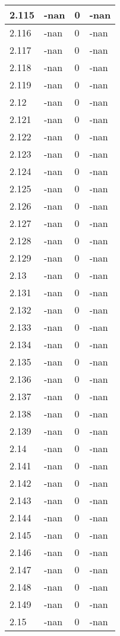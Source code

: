 \documentclass[a4paper,14pt]{extarticle}
\begin{document}
\begin{longtable}{||m{3cm}||m{3cm}|m{3cm}||m{3cm}||}
\hline
2.115 & -nan & 0 & -nan\\
\hline
2.116 & -nan & 0 & -nan\\
\hline
2.117 & -nan & 0 & -nan\\
\hline
2.118 & -nan & 0 & -nan\\
\hline
2.119 & -nan & 0 & -nan\\
\hline
2.12 & -nan & 0 & -nan\\
\hline
2.121 & -nan & 0 & -nan\\
\hline
2.122 & -nan & 0 & -nan\\
\hline
2.123 & -nan & 0 & -nan\\
\hline
2.124 & -nan & 0 & -nan\\
\hline
2.125 & -nan & 0 & -nan\\
\hline
2.126 & -nan & 0 & -nan\\
\hline
2.127 & -nan & 0 & -nan\\
\hline
2.128 & -nan & 0 & -nan\\
\hline
2.129 & -nan & 0 & -nan\\
\hline
2.13 & -nan & 0 & -nan\\
\hline
2.131 & -nan & 0 & -nan\\
\hline
2.132 & -nan & 0 & -nan\\
\hline
2.133 & -nan & 0 & -nan\\
\hline
2.134 & -nan & 0 & -nan\\
\hline
2.135 & -nan & 0 & -nan\\
\hline
2.136 & -nan & 0 & -nan\\
\hline
2.137 & -nan & 0 & -nan\\
\hline
2.138 & -nan & 0 & -nan\\
\hline
2.139 & -nan & 0 & -nan\\
\hline
2.14 & -nan & 0 & -nan\\
\hline
2.141 & -nan & 0 & -nan\\
\hline
2.142 & -nan & 0 & -nan\\
\hline
2.143 & -nan & 0 & -nan\\
\hline
2.144 & -nan & 0 & -nan\\
\hline
2.145 & -nan & 0 & -nan\\
\hline
2.146 & -nan & 0 & -nan\\
\hline
2.147 & -nan & 0 & -nan\\
\hline
2.148 & -nan & 0 & -nan\\
\hline
2.149 & -nan & 0 & -nan\\
\hline
2.15 & -nan & 0 & -nan\\

\end{longtable}
\end{document}
